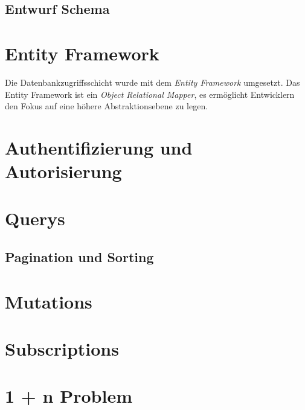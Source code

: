 \subsection{Entwurf Schema}

\section{Entity Framework}
Die Datenbankzugriffsschicht wurde mit dem \textit{Entity Framework} umgesetzt.
Das Entity Framework ist ein \textit{Object Relational Mapper}, es ermöglicht Entwicklern den Fokus auf eine höhere Abstraktionsebene zu legen.

\section{Authentifizierung und Autorisierung}

\section{Querys}
\subsection{Pagination und Sorting}

\section{Mutations}

\section{Subscriptions}

\section{1 + n Problem}


